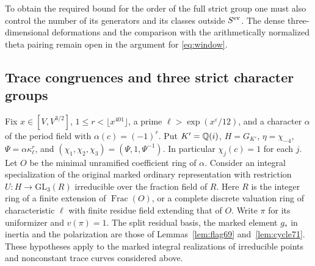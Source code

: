 \documentclass[a4paper,11pt]{article}
\theoremstyle{definition}
\theoremstyle{remark}
\numberwithin{equation}{section}
\begin{document}
To obtain the required bound for the order of the full
strict group one must also control the number of its generators
and its classes outside \(S^{\rm ev}\). The dense
three-dimensional deformations and the comparison with the
arithmetically normalized theta pairing remain open in the
argument for \eqref{eq:window}.

\subsection{Trace congruences and three strict character groups}\label{sec:markededges333}

Fix \(x\in[V,V^{3/2}]\), \(1\le r<\lfloor x^{401}\rfloor\), a prime
\(\ell>\exp(x^\varepsilon/12)\), and a character \(\alpha\) of the period
field with \(\alpha(c)=(-1)^r\). Put \(K'=\mathbb Q(i)\), \(H=G_{K'}\),
\(\eta=\chi_{-4}\), \(\Psi=\alpha\kappa_\ell^r\), and
\((\chi_1,\chi_2,\chi_3)=(\Psi,1,\Psi^{-1})\). In particular
\(\chi_j(c)=1\) for each \(j\). Let \(O\) be the minimal unramified
coefficient ring of \(\alpha\). Consider an integral specialization of
the original marked ordinary representation with restriction
\(U:H\to\mathrm{GL}_3(R)\) irreducible over the fraction field of \(R\).
Here \(R\) is the integer ring of a finite extension of
\(\operatorname{Frac}(O)\), or a complete discrete valuation ring of
characteristic \(\ell\) with finite residue field extending that of \(O\).
Write \(\pi\) for its uniformizer and \(v(\pi)=1\). The split residual
basis, the marked element \(g_*\) in inertia and the polarization are
those of Lemmas~\ref{lem:flag69} and~\ref{lem:cycle71}. These hypotheses
apply to the marked integral realizations of irreducible points and
nonconstant trace curves considered above.
\end{document}
